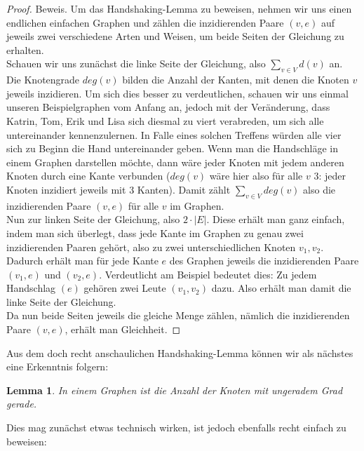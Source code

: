 \documentclass{article}
\newtheorem{lemma}{Lemma}
\begin{document}
\bigskip
\begin{proof}{Beweis.}
	Um das Handshaking-Lemma zu beweisen, nehmen wir uns einen endlichen einfachen Graphen und zählen die inzidierenden Paare $(v, e)$ auf jeweils zwei verschiedene Arten und Weisen, um beide Seiten der Gleichung zu erhalten.\\
	Schauen wir uns zunächst die linke Seite der Gleichung, also $\sum_{v \in V}d(v)$ an. Die Knotengrade $deg(v)$ bilden die Anzahl der Kanten, mit denen die Knoten $v$ jeweils inzidieren. Um sich dies besser zu verdeutlichen, schauen wir uns einmal unseren Beispielgraphen vom Anfang an, jedoch mit der Veränderung, dass Katrin, Tom, Erik und Lisa sich diesmal zu viert verabreden, um sich alle untereinander kennenzulernen. In Falle eines solchen Treffens würden alle vier sich zu Beginn die Hand untereinander geben. Wenn man die Handschläge in einem Graphen darstellen möchte, dann wäre jeder Knoten mit jedem anderen Knoten durch eine Kante verbunden ($deg(v)$ wäre hier also für alle $v$ $3$: jeder Knoten inzidiert jeweils mit $3$ Kanten). Damit zählt $\sum_{v \in V}deg(v)$ also die inzidierenden Paare $(v, e)$ für alle $v$ im Graphen.\\
	Nun zur linken Seite der Gleichung, also $2 \cdot |E|$. Diese erhält man ganz einfach, indem man sich überlegt, dass jede Kante im Graphen zu genau zwei inzidierenden Paaren gehört, also zu zwei unterschiedlichen Knoten $v_1, v_2$. Dadurch erhält man für jede Kante $e$ des Graphen jeweils die inzidierenden Paare $(v_1, e)$ und $(v_2, e)$. Verdeutlicht am Beispiel bedeutet dies: Zu jedem Handschlag $(e)$ gehören zwei Leute $(v_1, v_2)$ dazu. Also erhält man damit die linke Seite der Gleichung.\\
	Da nun beide Seiten jeweils die gleiche Menge zählen, nämlich die inzidierenden Paare $(v, e)$, erhält man Gleichheit.
\end{proof}
\bigskip
Aus dem doch recht anschaulichen Handshaking-Lemma können wir als nächstes eine Erkenntnis folgern:\\
\begin{lemma}
	In einem Graphen ist die Anzahl der Knoten mit \emph{ungeradem Grad} gerade.\\
\end{lemma}
\bigskip
Dies mag zunächst etwas technisch wirken, ist jedoch ebenfalls recht einfach zu beweisen:
\end{document}

